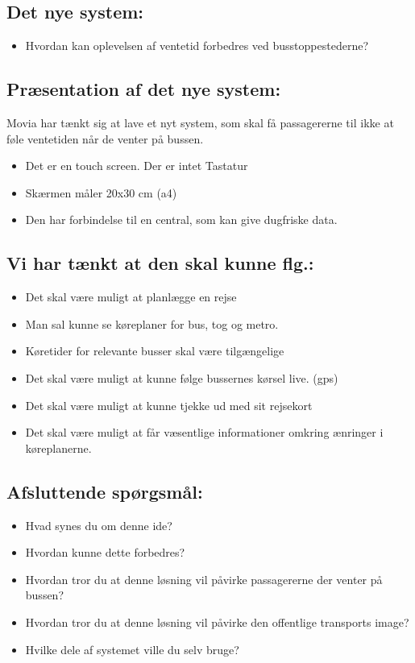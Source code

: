 \documentclass[12pt,a4paper,oneside]{article}
\begin{document}
\subsection{Det nye system:}
\begin{itemize}
\item Hvordan kan oplevelsen af ventetid forbedres ved busstoppestederne?
\end{itemize}
\subsection{Præsentation af det nye system:}
Movia har tænkt sig at lave et nyt system, som skal få passagererne til ikke at føle ventetiden når de venter på bussen.
\begin{itemize}
\item Det er en touch screen. Der er intet Tastatur
\item Skærmen måler 20x30 cm (a4)
\item Den har forbindelse til en central, som kan give dugfriske data.
\end{itemize}
\subsection{Vi har tænkt at den skal kunne flg.:}
\begin{itemize}
\item Det skal være muligt at planlægge en rejse
\item Man sal kunne se køreplaner for bus, tog og metro.
\item Køretider for relevante busser skal være tilgængelige
\item Det skal være muligt at kunne følge bussernes kørsel live. (gps)
\item Det skal være muligt at kunne tjekke ud med sit rejsekort
\item Det skal være muligt at får væsentlige informationer omkring ænringer i køreplanerne.
\end{itemize}
\subsection{Afsluttende spørgsmål:}
\begin{itemize}
\item Hvad synes du om denne ide?
\item Hvordan kunne dette forbedres?
\item Hvordan tror du at denne løsning vil påvirke passagererne der venter på bussen?
\item Hvordan tror du at denne løsning vil påvirke den offentlige transports image?
\item Hvilke dele af systemet ville du selv bruge?
\end{itemize}
\end{document}

